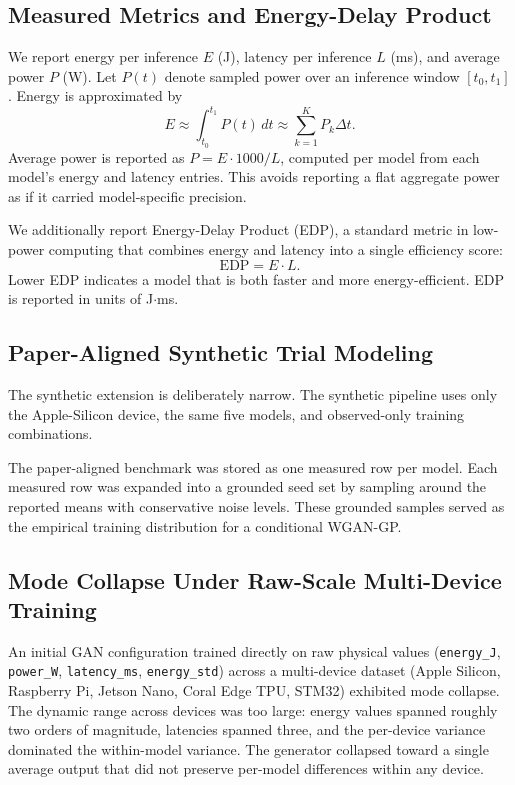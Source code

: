 \documentclass[conference]{IEEEtran}
\begin{document}
\subsection{Measured Metrics and Energy-Delay Product}
We report energy per inference $E$ (J), latency per inference $L$ (ms), and
average power $P$ (W). Let $P(t)$ denote sampled power over an inference window
$[t_0, t_1]$. Energy is approximated by
\begin{equation}
E \approx \int_{t_0}^{t_1} P(t)\,dt \approx \sum_{k=1}^{K} P_k \Delta t.
\end{equation}
Average power is reported as $P = E \cdot 1000 / L$, computed per model from
each model's energy and latency entries. This avoids reporting a flat aggregate
power as if it carried model-specific precision.

We additionally report Energy-Delay Product (EDP), a standard metric in
low-power computing \cite{horowitz2014} that combines energy and latency into
a single efficiency score:
\begin{equation}
\text{EDP} = E \cdot L.
\end{equation}
Lower EDP indicates a model that is both faster and more energy-efficient. EDP
is reported in units of J$\cdot$ms.

\subsection{Paper-Aligned Synthetic Trial Modeling}
The synthetic extension is deliberately narrow. The synthetic pipeline uses
only the Apple-Silicon device, the same five models, and observed-only
training combinations.

The paper-aligned benchmark was stored as one measured row per model. Each
measured row was expanded into a grounded seed set by sampling around the
reported means with conservative noise levels. These grounded samples served
as the empirical training distribution for a conditional WGAN-GP.

\subsection{Mode Collapse Under Raw-Scale Multi-Device Training}
An initial GAN configuration trained directly on raw physical values
(\texttt{energy\_J}, \texttt{power\_W}, \texttt{latency\_ms},
\texttt{energy\_std}) across a multi-device dataset (Apple Silicon, Raspberry
Pi, Jetson Nano, Coral Edge TPU, STM32) exhibited mode collapse. The dynamic
range across devices was too large: energy values spanned roughly two orders
of magnitude, latencies spanned three, and the per-device variance dominated
the within-model variance. The generator collapsed toward a single average
output that did not preserve per-model differences within any device.
\end{document}
